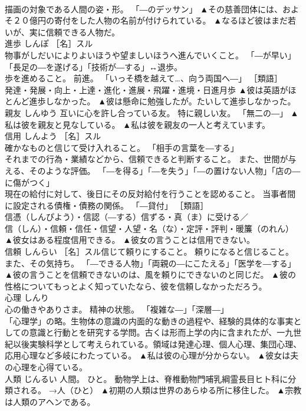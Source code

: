 \documentclass[8pt]{extreport}
\begin{document}
\begin{CJK}{UTF8}{min}
\\	描画の対象である人間の姿・形。 「―のデッサン」	▲その慈善団体には、およそ２０億円の寄付をした人物の名前が付けられている。 ▲なるほど彼はまだ若いが、実に信頼できる人物だ。
\\	進歩	しんぽ	［名］スル 
\\	物事がしだいによりよいほうや望ましいほうへ進んでいくこと。 「―が早い」「長足の―を遂げる」「技術が―する」↔退歩。 
\\	歩を進めること。 前進。 「いっそ橋を越えて…、向う両国へ―」 ［類語］
\\	発達・発展・向上・上達・進化・進展・飛躍・進境・日進月歩	▲彼は英語がほとんど進歩しなかった。 ▲彼は懸命に勉強したが。たいして進歩しなかった。
\\	親友	しんゆう	互いに心を許し合っている友。 特に親しい友。 「無二の―」	▲私は彼を親友と見なしている。 ▲私は彼を親友の一人と考えています。
\\	信用	しんよう	［名］スル 
\\	確かなものと信じて受け入れること。 「相手の言葉を―する」 
\\	それまでの行為・業績などから、信頼できると判断すること。 また、世間が与える、そのような評価。 「―を得る」「―を失う」「―の置けない人物」「店の―に傷がつく」 
\\	現在の給付に対して、後日にその反対給付を行うことを認めること。 当事者間に設定される債権・債務の関係。 「―貸付」 ［類語］
\\	信憑（しんぴよう）・信認（―する）信ずる・真（ま）に受ける／
\\	信（しん）・信頼・信任・信望・人望・名（な）・定評・評判・暖簾（のれん）	▲彼女はある程度信用できる。 ▲彼女の言うことは信用できない。
\\	信頼	しんらい	［名］スル信じて頼りにすること。 頼りになると信じること。 また、その気持ち。 「―できる人物」「両親の―にこたえる」「医学を―する」	▲彼の言うことを信頼できないのは、風を頼りにできないのと同じだ。 ▲彼の性格についてもっとよく知っていたなら、彼を信頼しなかっただろう。
\\	心理	しんり	
\\	心の働きやありさま。 精神の状態。 「複雑な―」「深層―」 
\\	「心理学」の略。生物体の意識の内面的な動きの過程や、経験的具体的な事実としての意識と行動とを研究する学問。古くは形而上学の内に含まれたが、一九世紀以後実験科学として考えられている。領域は発達心理、個人心理、集団心理、応用心理など多岐にわたっている。	▲私は彼の心理が分からない。 ▲彼女は夫の心理を心得ている。
\\	人類	じんるい	人間。 ひと。 動物学上は、脊椎動物門哺乳綱霊長目ヒト科に分類される。 →人（ひと）	▲初期の人類は世界のあらゆる所に移住した。 ▲宗教は人類のアヘンである。

\end{CJK}
\end{document}
